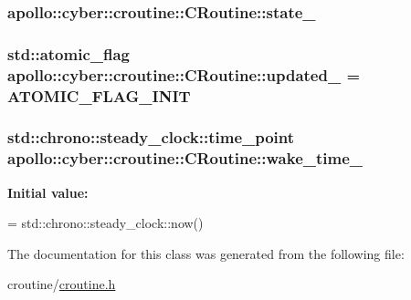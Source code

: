 \hypertarget{classapollo_1_1cyber_1_1croutine_1_1CRoutine_a50f7996bfdacc4455012d2701b91890e}{
\subsubsection[{state\-\_\-}]{ apollo\-::cyber\-::croutine\-::\-C\-Routine\-::state\-\_\-\hspace{0.3cm}{\ttfamily [private]}}}\label{classapollo_1_1cyber_1_1croutine_1_1CRoutine_a50f7996bfdacc4455012d2701b91890e}
\hypertarget{classapollo_1_1cyber_1_1croutine_1_1CRoutine_a1f4f88bf13f02aa9d963159db66570ad}{
\subsubsection[{updated\-\_\-}]{\setlength{\rightskip}{0pt plus 5cm}std\-::atomic\-\_\-flag apollo\-::cyber\-::croutine\-::\-C\-Routine\-::updated\-\_\- = A\-T\-O\-M\-I\-C\-\_\-\-F\-L\-A\-G\-\_\-\-I\-N\-I\-T\hspace{0.3cm}{\ttfamily [private]}}}\label{classapollo_1_1cyber_1_1croutine_1_1CRoutine_a1f4f88bf13f02aa9d963159db66570ad}
\hypertarget{classapollo_1_1cyber_1_1croutine_1_1CRoutine_abd2684b9c1a6fcbbe4afcc1b5f8b6ccc}{
\subsubsection[{wake\-\_\-time\-\_\-}]{\setlength{\rightskip}{0pt plus 5cm}std\-::chrono\-::steady\-\_\-clock\-::time\-\_\-point apollo\-::cyber\-::croutine\-::\-C\-Routine\-::wake\-\_\-time\-\_\-\hspace{0.3cm}{\ttfamily [private]}}}\label{classapollo_1_1cyber_1_1croutine_1_1CRoutine_abd2684b9c1a6fcbbe4afcc1b5f8b6ccc}
{\bfseries Initial value\-:}
\begin{DoxyCode}
=
      std::chrono::steady\_clock::now()
\end{DoxyCode}


The documentation for this class was generated from the following file\-:\begin{DoxyCompactItemize}
\item 
croutine/\hyperlink{croutine_8h}{croutine.\-h}\end{DoxyCompactItemize}
